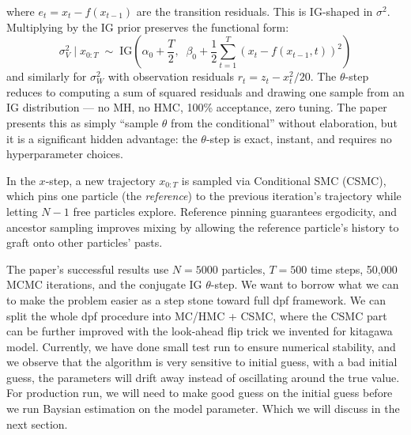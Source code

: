 \documentclass{article}
\begin{document}
where $e_t = x_t - f(x_{t-1})$ are the transition residuals. This is IG-shaped in $\sigma^2$. Multiplying by the IG prior preserves the functional form:
\begin{equation}
    \sigma_V^2 \mid x_{0:T} \;\sim\; \text{IG}\!\left(\alpha_0 + \frac{T}{2},\;\; \beta_0 + \frac{1}{2}\sum_{t=1}^{T}\!\left(x_t - f(x_{t-1},t)\right)^2\right)
\end{equation}
and similarly for $\sigma_W^2$ with observation residuals $r_t = z_t - x_t^2/20$. The $\theta$-step reduces to computing a sum of squared residuals and drawing one sample from an IG distribution --- no MH, no HMC, 100\% acceptance, zero tuning. The paper presents this as simply ``sample $\theta$ from the conditional'' without elaboration, but it is a significant hidden advantage: the $\theta$-step is exact, instant, and requires no hyperparameter choices.

In the $x$-step, a new trajectory $x_{0:T}$ is sampled via Conditional SMC (CSMC)\cite{Andrieu2010,Lindsten2014}, which pins one particle (the \textit{reference}) to the previous iteration's trajectory while letting $N-1$ free particles explore. Reference pinning guarantees ergodicity, and ancestor sampling\cite{Lindsten2014} improves mixing by allowing the reference particle's history to graft onto other particles' pasts.

The paper's successful results use $N = 5000$ particles, $T = 500$ time steps, 50,000 MCMC iterations, and the conjugate IG $\theta$-step. We want to borrow what we can to make the problem easier as a step stone toward full dpf framework. We can split the whole dpf procedure into MC/HMC + CSMC, where the CSMC part can be further improved with the look-ahead flip trick we invented for kitagawa model. Currently, we have done small test run  to ensure numerical stability, and we observe that the algorithm is very sensitive to initial guess, with a bad initial guess, the parameters will drift away instead of oscillating around the true value. For production run, we will need to make good guess on the initial guess before we run Baysian estimation on the model parameter. Which we will discuss in the next section.
\end{document}
